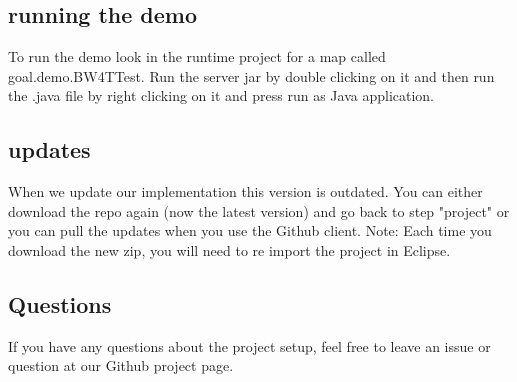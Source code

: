 \documentclass{scrartcl}
\begin{document}
\subsection{running the demo}
To run the demo look in the runtime project for a map called goal.demo.BW4TTest. Run the server jar by double clicking on it and then run the .java file by right clicking on it and press run as Java application.

\subsection{updates}
When we update our implementation this version is outdated. You can either download the repo again (now the latest version) and go back to step "project" or you can pull the updates when you use the Github client.
Note: Each time you download the new zip, you will need to re import the project in Eclipse.


\subsection{Questions}
If you have any questions about the project setup, feel free to leave an issue or question at our Github project page.
\end{document}
